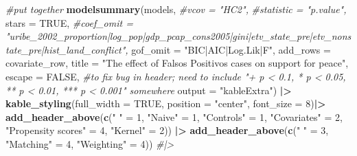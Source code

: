 \documentclass[
]{article}
\newenvironment{Shaded}{\begin{snugshade}}{\end{snugshade}}
\newcommand{\AttributeTok}[1]{\textcolor[rgb]{0.13,0.29,0.53}{#1}}
\newcommand{\CommentTok}[1]{\textcolor[rgb]{0.56,0.35,0.01}{\textit{#1}}}
\newcommand{\ConstantTok}[1]{\textcolor[rgb]{0.56,0.35,0.01}{#1}}
\newcommand{\DecValTok}[1]{\textcolor[rgb]{0.00,0.00,0.81}{#1}}
\newcommand{\FunctionTok}[1]{\textcolor[rgb]{0.13,0.29,0.53}{\textbf{#1}}}
\newcommand{\NormalTok}[1]{#1}
\newcommand{\OtherTok}[1]{\textcolor[rgb]{0.56,0.35,0.01}{#1}}
\newcommand{\SpecialCharTok}[1]{\textcolor[rgb]{0.81,0.36,0.00}{\textbf{#1}}}
\newcommand{\StringTok}[1]{\textcolor[rgb]{0.31,0.60,0.02}{#1}}
\begin{document}
\begin{Shaded}
\begin{Highlighting}[]
\CommentTok{\#put together}
\FunctionTok{modelsummary}\NormalTok{(models, }
             \CommentTok{\#vcov = "HC2",}
             \CommentTok{\#statistic = "p.value",}
             \AttributeTok{stars =} \ConstantTok{TRUE}\NormalTok{,}
             \CommentTok{\#coef\_omit = "uribe\_2002\_proportion|log\_pop|gdp\_pcap\_cons2005|gini|etv\_state\_pre|etv\_nonstate\_pre|hist\_land\_conflict",}
             \AttributeTok{gof\_omit =} \StringTok{"BIC|AIC|Log.Lik|F"}\NormalTok{,}
             \AttributeTok{add\_rows =}\NormalTok{ covariate\_row,}
             \AttributeTok{title =} \StringTok{"The effect of Falsos Positivos cases on support for peace"}\NormalTok{,}
             \AttributeTok{escape =} \ConstantTok{FALSE}\NormalTok{, }\CommentTok{\#to fix bug in header; need to include "+ p \textless{} 0.1, * p \textless{} 0.05, ** p \textless{} 0.01, *** p \textless{} 0.001" somewhere}
             \AttributeTok{output =} \StringTok{"kableExtra"}\NormalTok{) }\SpecialCharTok{|\textgreater{}} 
  \FunctionTok{kable\_styling}\NormalTok{(}\AttributeTok{full\_width =} \ConstantTok{TRUE}\NormalTok{, }\AttributeTok{position =} \StringTok{"center"}\NormalTok{, }\AttributeTok{font\_size =} \DecValTok{8}\NormalTok{)}\SpecialCharTok{|\textgreater{}}
  \FunctionTok{add\_header\_above}\NormalTok{(}\FunctionTok{c}\NormalTok{(}\StringTok{" "} \OtherTok{=} \DecValTok{1}\NormalTok{, }\StringTok{"Naive"} \OtherTok{=} \DecValTok{1}\NormalTok{, }\StringTok{"Controls"} \OtherTok{=} \DecValTok{1}\NormalTok{, }\StringTok{"Covariates"} \OtherTok{=} \DecValTok{2}\NormalTok{, }\StringTok{"Propensity scores"} \OtherTok{=} \DecValTok{4}\NormalTok{, }\StringTok{"Kernel"} \OtherTok{=} \DecValTok{2}\NormalTok{)) }\SpecialCharTok{|\textgreater{}}
  \FunctionTok{add\_header\_above}\NormalTok{(}\FunctionTok{c}\NormalTok{(}\StringTok{" "} \OtherTok{=} \DecValTok{3}\NormalTok{, }\StringTok{"Matching"} \OtherTok{=} \DecValTok{4}\NormalTok{, }\StringTok{"Weighting"} \OtherTok{=} \DecValTok{4}\NormalTok{)) }\CommentTok{\#|\textgreater{}}
\end{Highlighting}
\end{Shaded}
\end{document}
